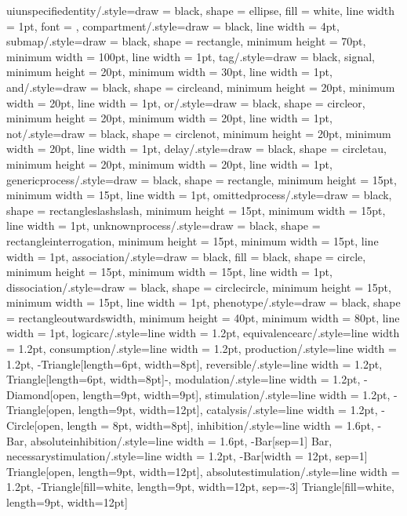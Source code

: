 {    uiunspecifiedentity/.style={draw = black, shape = ellipse, fill = white, line width = 1pt, font = {\tiny\sffamily}},
    compartment/.style={draw = black, line width = 4pt},
    submap/.style={draw = black, shape = rectangle, minimum height = 70pt, minimum width = 100pt, line width = 1pt},
    tag/.style={draw = black, signal, minimum height = 20pt, minimum width = 30pt, line width = 1pt},
    and/.style={draw = black, shape = circleand, minimum height = 20pt, minimum width = 20pt, line width = 1pt},
    or/.style={draw = black, shape = circleor, minimum height = 20pt, minimum width = 20pt, line width = 1pt},
    not/.style={draw = black, shape = circlenot, minimum height = 20pt, minimum width = 20pt, line width = 1pt},
    delay/.style={draw = black, shape = circletau, minimum height = 20pt, minimum width = 20pt, line width = 1pt},
    genericprocess/.style={draw = black, shape = rectangle, minimum height = 15pt, minimum width = 15pt, line width = 1pt},
    omittedprocess/.style={draw = black, shape = rectangleslashslash, minimum height = 15pt, minimum width = 15pt, line width = 1pt},
    unknownprocess/.style={draw = black, shape = rectangleinterrogation, minimum height = 15pt, minimum width = 15pt, line width = 1pt},
    association/.style={draw = black, fill = black, shape = circle, minimum height = 15pt, minimum width = 15pt, line width = 1pt},
    dissociation/.style={draw = black, shape = circlecircle, minimum height = 15pt, minimum width = 15pt, line width = 1pt},
    phenotype/.style={draw = black, shape = rectangleoutwardswidth, minimum height = 40pt, minimum width = 80pt, line width = 1pt},
    logicarc/.style={line width = 1.2pt},
    equivalencearc/.style={line width = 1.2pt},
    consumption/.style={line width = 1.2pt},
    production/.style={line width = 1.2pt, -{Triangle[length=6pt, width=8pt]}},
    reversible/.style={line width = 1.2pt, {Triangle[length=6pt, width=8pt]}-},
    modulation/.style={line width = 1.2pt, -{Diamond[open, length=9pt, width=9pt]}},
    stimulation/.style={line width = 1.2pt, -{Triangle[open, length=9pt, width=12pt]}},
    catalysis/.style={line width = 1.2pt, -{Circle[open, length = 8pt, width=8pt]}},
    inhibition/.style={line width = 1.6pt, -{Bar}},
    absoluteinhibition/.style={line width = 1.6pt, -{Bar[sep=1] Bar}},
    necessarystimulation/.style={line width = 1.2pt, -{Bar[width = 12pt, sep=1] Triangle[open, length=9pt, width=12pt]}},
    absolutestimulation/.style={line width = 1.2pt, -{Triangle[fill=white, length=9pt, width=12pt, sep=-3] Triangle[fill=white, length=9pt, width=12pt]}}}

